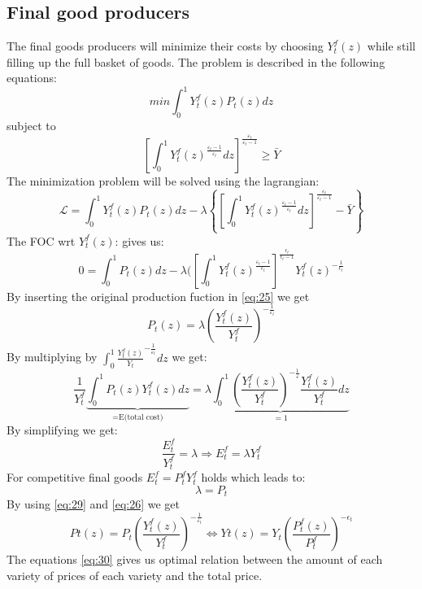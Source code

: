 \documentclass[10pt,a4paper]{article}
\begin{document}
\subsection{Final good producers}
The final goods producers will minimize their costs by choosing $Y_{t}^{f}(z)$ while still filling up the full basket of goods. The problem is described in the following equations:
\begin{equation}
min \int_0^1 Y_t^f(z) P_t(z) dz
\end{equation}
subject to
\begin{equation}
\left[ \int_{0}^{1} Y_t^f(z)^ \frac{\varepsilon_{t}-1}{\varepsilon_{t}} dz \right]^\frac{\varepsilon_{t}}{\varepsilon_{t}-1}\geqslant \bar{Y}
\end{equation}
The minimization problem will be solved using the lagrangian:
\begin{equation}
\mathcal{L} = \int_0^1 Y_t^f(z) P_t(z) dz - \lambda \left \{ \left[ \int_{0}^{1} Y_t^f(z)^ \frac{\varepsilon_{t}-1}{\varepsilon_{t}} dz \right]^\frac{\varepsilon_{t}}{\varepsilon_{t}-1} - \bar{Y}\right\}
\end{equation}
The FOC wrt $Y_{t}^{f}(z)$:
gives us:
\begin{equation}\label{eq:25}
0=\int_{0}^{1}P_{t}(z)dz - \lambda(\left[\int_{0}^{1}Y_{t}^{f}(z)^{\frac{\varepsilon_{t}-1}{\epsilon_{t}}}\right]^{\frac{\epsilon_{t}}{\epsilon_{t}-1}}Y_{t}^{f}(z)^{-\frac{1}{\epsilon_{t}}}
\end{equation}\label{eq:26}
By inserting the original production fuction in \eqref{eq:25} we get
\begin{equation}
P_t(z)= \lambda \left( \frac{Y_t^f(z)}{Y_t^f}\right)^{-\frac{1}{\varepsilon_{t}}}
\end{equation}
By multiplying by $\int_{0}^{1}\frac{Y_{t}^{f}(z)}{Y_{t}}^{-\frac{1}{\varepsilon_{t}}}dz$ we get:
\begin{equation}
\frac{1}{Y_t^f} \underbrace{\int_{0}^{1} P_t(z)Y_t^f (z)dz}_{\text{=E(total cost)}} =
\lambda 
\underbrace{
\int_0^1 \left( \frac{Y_t^f(z)}{Y_t^f} \right)^{-\frac{1}{\varepsilon}} \frac{Y_t^f(z)}{Y_t^f} dz
}_{=1}
\end{equation}
By simplifying we get:
\begin{equation}
\frac{E_{t}^{f}}{Y_{t}^{f}} = \lambda \Rightarrow E_{t}^{f}=\lambda Y_{t}^{f}
\end{equation}
For competitive final goods $E_{t}^{f}=P_{t}^{f}Y_{t}^{f}$ holds which leads to:
\begin{equation}\label{eq:29}
\lambda = P_{t}
\end{equation}
By using \eqref{eq:29} and \eqref{eq:26} we get
\begin{equation}\label{eq:30}
P{t}(z)=P_{t}(\frac{Y_{t}^{f}(z)}{Y_{t}^{f}})^{-\frac{1}{\varepsilon_{t}}} \Leftrightarrow Y{t}(z)=Y_{t}(\frac{P_{t}^{f}(z)}{P_{t}^{f}})^{-\epsilon_{t}}
\end{equation}
The equations \eqref{eq:30} gives us optimal relation between the amount of each variety of prices of each variety and the total price.
\end{document}
